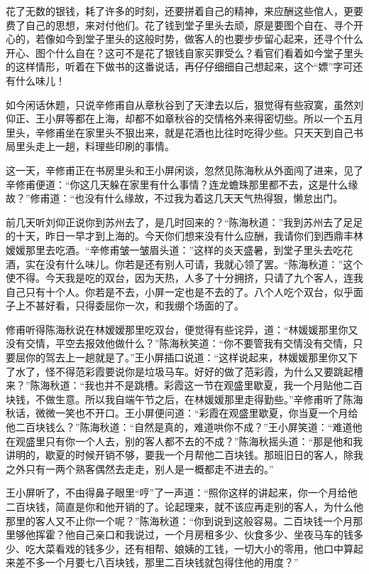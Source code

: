 \documentclass[12pt,UTF8]{ctexbook}
\begin{document}
{{{花了无数的银钱，耗了许多的时刻，还要拼着自己的精神，来应酬这些倌人，更要费了自己的思想，来对付他们。花了钱到堂子里头去顽，原是要图个自在、寻个开心的，若像如今到堂子里头的这般时势，做客人的也要步步留心起来，还寻个什么开心、图个什么自在？这可不是花了银钱自家买罪受么？看官们看着如今堂子里头的这样情形，听着在下做书的这番说话，再仔仔细细自己想起来，这个“嫖”字可还有什么味儿！

如今闲话休题，只说辛修甫自从章秋谷到了天津去以后，狠觉得有些寂寞，虽然刘仰正、王小屏等都在上海，却都不如章秋谷的交情格外来得密切些。所以一个五月里头，辛修甫坐在家里头不狠出来，就是花酒也比往时吃得少些。只天天到自己书局里头走上一趟，料理些印刷的事情。

这一天，辛修甫正在书房里头和王小屏闲谈，忽然见陈海秋从外面闯了进来，见了辛修甫便道：“你这几天躲在家里有什么事情？连龙蟾珠那里都不去，这是什么缘故？”修甫道：“也没有什么缘故，不过我为着这几天天气热得狠，懒怠出门。

前几天听刘仰正说你到苏州去了，是几时回来的？“陈海秋道：”我到苏州去了足足的十天，昨日一早才到上海的。今天你们想来没有什么应酬，我请你们到西鼎丰林嫒媛那里去吃酒。“辛修甫皱一皱眉头道：”这样的炎天盛暑，到堂子里头去吃花酒，实在没有什么味儿。你若是还有别人可请，我就心领了罢。“陈海秋道：”这个使不得。今天我是吃的双台，因为天热，人多了十分拥挤，只请了九个客人，连我自己只有十个人。你若是不去，小屏一定也是不去的了。八个人吃个双台，似乎面子上不甚好看，只得委屈你一次，和我绷个场面的了。

修甫听得陈海秋说在林嫒嫒那里吃双台，便觉得有些诧异，道：“林媛媛那里你又没有交情，平空去报效他做什么？”陈海秋笑道：“你不要管我有交情没有交情，只要屈你的驾去上一趟就是了。”王小屏插口说道：“这样说起来，林媛媛那里你又下了水了，怪不得范彩霞要说你是垃圾马车。好好的做了范彩霞，为什么又要跳起槽来？”陈海秋道：“我也并不是跳槽。彩霞这一节在观盛里歇夏，我一个月贴他二百块钱，不做生意。所以我自端午节之后，在林媛媛那里走得勤些。”辛修甫听了陈海秋话，微微一笑也不开口。王小屏便问道：“彩霞在观盛里歇夏，你当夏一个月给他二百块钱么？”陈海秋道：“自然是真的，难道哄你不成？”王小屏笑道：“难道他在观盛里只有你一个人去，别的客人都不去的不成？”陈海秋摇头道：“那是他和我讲明的，歇夏的时候开销不够，要我一个月帮他二百块钱。那班旧日的客人，除我之外只有一两个熟客偶然去走走，别人是一概都走不进去的。”

王小屏听了，不由得鼻子眼里“哼”了一声道：“照你这样的讲起来，你一个月给他二百块钱，简直是你和他开销的了。论起理来，就不该应再走别的客人，为什么他那里的客人又不止你一个呢？”陈海秋道：“你到说到这般容易。二百块钱一个月那里够他挥霍？他自己亲口和我说过，一个月房租多少、伙食多少、坐夜马车的钱多少、吃大菜看戏的钱多少，还有相帮、娘姨的工钱，一切大小的零用，他口中算起来差不多一个月要七八百块钱，那里二百块钱就包得住他的用度？”

}}}
\end{document}
